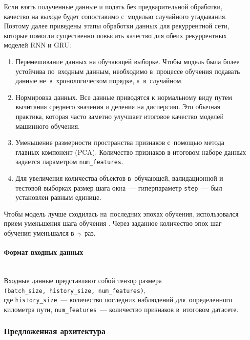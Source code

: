 \clearpage
Если взять полученные данные и подать без предварительной обработки, качество на выходе будет
сопоставимо с~моделью случайного угадывания. Поэтому далее приведены этапы обработки данных для 
рекуррентной сети, которые помогли существенно повысить качество для обеих рекуррентных моделей RNN и GRU:
\begin{enumerate}[wide]
	\item Перемешивание данных на обучающей выборке. Чтобы модель была более устойчива по~входным
	данным, необходимо в~процессе обучения подавать данные не~в~хронологическом порядке, а~в~случайном.
	
	\item Нормировка данных. Все данные приводятся к нормальному виду путем вычитания среднего значения
	и деления на дисперсию. Это обычная практика, которая часто заметно улучшает итоговое качество моделей
	машинного обучения.
	
	\item Уменьшение размерности пространства признаков с~помощью метода главных компонент 
	(PCA). Количество признаков в итоговом наборе данных задается
	параметром \texttt{num\_features}.
	
	\item Для увеличения количества объектов в~обучающей, валидационной и тестовой выборках размер
	шага окна~--- гиперпараметр \texttt{step}~--- был установлен равным единице.
\end{enumerate}

Чтобы модель лучше сходилась на~последних эпохах обучения, использовался прием уменьшения 
шага обучения \cite{pytorch_doc}. Через заданное количество эпох шаг обучения уменьшался в~$ \gamma $~раз.

\clearpage
\paragraph{Формат входных данных}~\\
Входные данные представляют собой тензор размера \texttt{(batch\_size,~history\_size,~num\_features)},\\ 
где \texttt{history\_size}~--- количество последних наблюдений для~определенного километра пути,
\texttt{num\_features}~--- количество признаков в~итоговом датасете.

\subsubsection{Предложенная архитектура}

